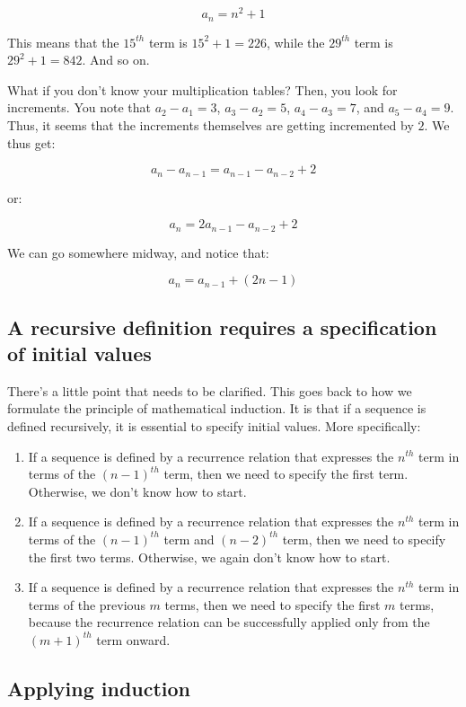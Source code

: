 \documentclass{amsart}
\begin{document}
$$a_n = n^2 + 1$$

This means that the $15^{th}$ term is $15^2 + 1 = 226$, while the
$29^{th}$ term is $29^2 + 1 = 842$. And so on.

What if you don't know your multiplication tables? Then, you look for
increments. You note that $a_2 - a_1 = 3$, $a_3 - a_2 = 5$, $a_4 - a_3
= 7$, and $a_5 - a_4 = 9$. Thus, it seems that the increments
themselves are getting incremented by $2$. We thus get:

$$a_n - a_{n-1} = a_{n-1} - a_{n-2} + 2$$

or:

$$a_n = 2a_{n-1} -a_{n-2} + 2$$

We can go somewhere midway, and notice that:

$$a_n = a_{n-1} + (2n - 1)$$

\subsection{A recursive definition requires a specification of initial values}

There's a little point that needs to be clarified. This goes back to
how we formulate the principle of mathematical induction. It is that
if a sequence is defined recursively, it is essential to specify
initial values. More specifically:

\begin{enumerate}
\item If a sequence is defined by a recurrence relation that expresses
  the $n^{th}$ term in terms of the $(n-1)^{th}$ term, then we need to
  specify the first term. Otherwise, we don't know how to start.
\item If a sequence is defined by a recurrence relation that expresses
  the $n^{th}$ term in terms of the $(n-1)^{th}$ term and $(n-2)^{th}$
  term, then we need to specify the first two terms. Otherwise, we
  again don't know how to start.
\item If a sequence is defined by a recurrence relation that expresses
  the $n^{th}$ term in terms of the previous $m$ terms, then we need
  to specify the first $m$ terms, because the recurrence relation can
  be successfully applied only from the $(m+1)^{th}$ term onward.
\end{enumerate}

\subsection{Applying induction}
\end{document}
